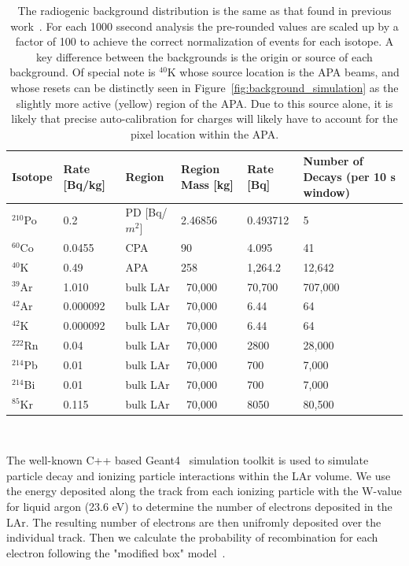 \begin{table}
\begin{centering}
\begin{tabular}{|p{15mm} p{15mm} p{20mm} p{20mm} p{20mm} p{35mm} |}
 \hline
 Isotope & Rate [Bq/kg] & Region & Region Mass [kg] & Rate [Bq] & Number of Decays (per 10 s window) \\ [0.5ex]
 \hline\hline
  $^{210}$Po & 0.2 & PD [Bq/$m^2$] & 2.46856 & 0.493712 & 5 \\
  $^{60}$Co & 0.0455 & CPA & 90 & 4.095 & 41 \\
  $^{40}$K & 0.49 & APA & 258 & 1,264.2 & 12,642 \\
  $^{39}$Ar & 1.010 & bulk LAr & ~70,000 & 70,700 & 707,000 \\
  $^{42}$Ar & 0.000092 & bulk LAr & ~70,000 & 6.44 & 64 \\
  $^{42}$K  & 0.000092 & bulk LAr & ~70,000 & 6.44 & 64 \\
  $^{222}$Rn & 0.04 & bulk LAr & ~70,000 & 2800 & 28,000 \\
  $^{214}$Pb & 0.01 & bulk LAr & ~70,000 & 700 & 7,000 \\
  $^{214}$Bi & 0.01 & bulk LAr & ~70,000 & 700 & 7,000 \\
  $^{85}$Kr & 0.115 & bulk LAr & ~70,000 & 8050 & 80,500 \\
 \hline
\end{tabular}
\caption{The radiogenic background distribution is the same as that found in previous work~\citep{qpix:shion}.
For each 1000 ssecond analysis the pre-rounded values are scaled up by a factor of 100 to achieve the correct normalization of events for each isotope.
A key difference between the backgrounds is the origin or source of each background.
Of special note is $^{40}$K whose source location is the APA beams, and whose resets can be distinctly seen in Figure~\ref{fig:background_simulation} as the slightly more active (yellow) region of the APA.
Due to this source alone, it is likely that precise auto-calibration for charges will likely have to account for the pixel location within the APA.
}
\end{centering}
\end{table}
~\label{table:radiogenic_backgrounds}

The well-known C++ based Geant4~\citep{geant4:AGOSTINELLI2003250} simulation toolkit is used to simulate particle decay and ionizing particle interactions within the LAr volume.
We use the energy deposited along the track from each ionizing particle with the W-value for liquid argon (23.6 eV) to determine the number of electrons deposited in the LAr.
The resulting number of electrons are then unifromly deposited over the individual track.
Then we calculate the probability of recombination for each electron following the "modified box" model~\citep{2013JInst...8P8005A}.

